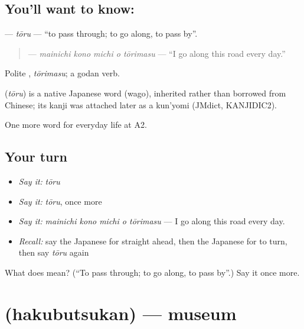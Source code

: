 \subsection*{You'll want to know: }
\textbf{} — \emph{tōru} — \textquotedblleft{}to pass through; to go along, to pass by\textquotedblright{}.

\begin{quote}
\textbf{   } — \emph{mainichi kono michi o tōrimasu} — \textquotedblleft{}I go along this road every day.\textquotedblright{}
\end{quote}

Polite \textbf{}, \emph{tōrimasu}; a godan verb.

\begin{cousinweb}
\textbf{} (\emph{tōru}) is a native Japanese word (wago), inherited rather than borrowed from Chinese; its kanji was attached later as a kun'yomi (JMdict, KANJIDIC2).
\end{cousinweb}

\begin{grammarlens}[title={What you've built}]
One more word for everyday life at A2.
\end{grammarlens}

\subsection*{Your turn}
\begin{itemize}
\raggedright
  \item \emph{Say it:} \emph{tōru}
  \item \emph{Say it:} \emph{tōru}, once more
  \item \emph{Say it:} \emph{mainichi kono michi o tōrimasu} — I go along this road every day.
  \item \emph{Recall:} say the Japanese for straight ahead, then the Japanese for to turn, then say \emph{tōru} again
\end{itemize}

\begin{tcolorbox}[breakable,colback=teal!4,colframe=teal!35!black,title={Before you move on}]
What does  mean? (\textquotedblleft{}To pass through; to go along, to pass by\textquotedblright{}.) Say it once more.
\end{tcolorbox}
\section[\texorpdfstring{\ja{はくぶつかん} (hakubutsukan)}{はくぶつかん (hakubutsukan)}]{ (hakubutsukan) — museum}

